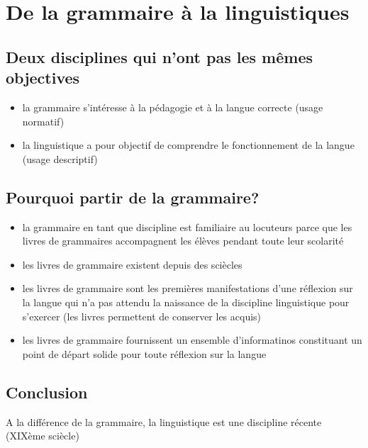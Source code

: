 \section{De la grammaire à la linguistiques}
\subsection{Deux disciplines qui n'ont pas les mêmes objectives}
\begin{itemize}
   \item la grammaire s'intéresse à la pédagogie et à la langue correcte (usage normatif)
   \item la linguistique a pour objectif de comprendre le fonctionnement de la langue (usage descriptif)
\end{itemize}
\subsection{Pourquoi partir de la grammaire?}
\begin{itemize}
   \item   la grammaire en tant que discipline est familiaire au locuteurs parce que les livres de grammaires accompagnent les élèves pendant toute leur scolarité
   \item   les livres de grammaire existent depuis des sciècles 
   \item   les livres de grammaire sont les premières manifestations d'une réflexion sur la langue qui n'a pas attendu la naissance de la discipline linguistique pour s'exercer (les livres permettent de conserver les acquis)
   \item   les livres de grammaire fournissent un ensemble d'informatinos constituant un point de départ solide pour toute réflexion sur la langue
\end{itemize}
\subsection{Conclusion}
   A la différence de la grammaire, la linguistique est une discipline récente (XIXème sciècle)

